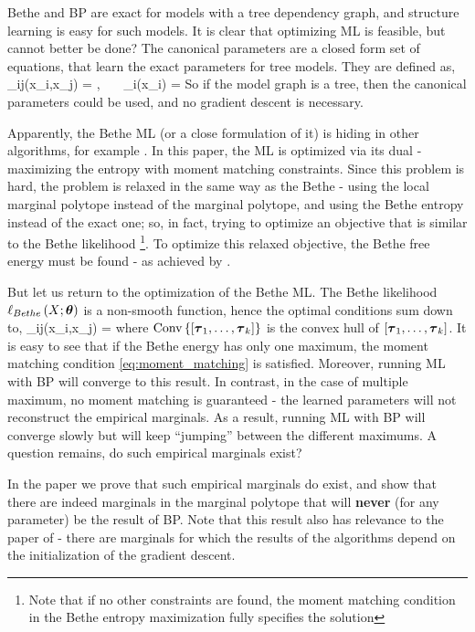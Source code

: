 Bethe and BP are exact for models with a tree dependency graph, and structure learning is easy for such models.
It is clear that optimizing ML is feasible, but cannot better be done?  
The canonical parameters are a closed form set of equations, that learn the exact parameters for tree models.
They are defined as,
\be
\label{eq:canonical}
\theta_{ij}(x_i,x_j) = , \ \ \ \theta_i(x_i) = 
\ee
So if the model graph is a tree, then the canonical parameters could be used, and no gradient descent is necessary.

Apparently, the Bethe ML (or a close formulation of it) is hiding in other algorithms, for example \cite{ganapathi2012constrained}.
In this paper, the ML is optimized via its dual - maximizing the entropy with moment matching constraints.
Since this problem is hard, the problem is relaxed in the same way as the Bethe - using the local marginal polytope instead of the marginal polytope, and using the Bethe entropy instead of the exact one; 
so, in fact, trying to optimize an objective that is similar to the Bethe likelihood \footnote{Note that if no other constraints are found, the moment matching condition in the Bethe entropy maximization fully specifies the solution}.
To optimize this relaxed objective, the Bethe free energy must be found - as achieved by \cite{yuille2002cccp}.

But let us return to the optimization of the Bethe ML.
The Bethe likelihood $\ell_{Bethe}\left(X;\boldsymbol{\theta}\right)$ is a non-smooth function, hence the optimal conditions sum down to,
\be
\label{eq:bethe_opt}
\mu_{ij}(x_i,x_j) = 
\ee
where $\text{Conv}\left\{[\boldsymbol{\tau}_1,\ldots,\boldsymbol{\tau}_k]\right\}$ is the convex hull of $[\boldsymbol{\tau}_1,\ldots,\boldsymbol{\tau}_k]$.
It is easy to see that if the Bethe energy has only one maximum, the moment matching condition \eqref{eq:moment_matching} is satisfied.
Moreover, running ML with BP will converge to this result.
In contrast, in the case of multiple maximum, no moment matching is guaranteed - the learned parameters will not reconstruct the empirical marginals.
As a result, running ML with BP will converge slowly but will keep ``jumping'' between the different maximums. 
A question remains, do such empirical marginals exist?

In the paper \cite{heinemann2012cannot} we prove that such empirical marginals do exist, and show that there are indeed marginals in the marginal polytope that will \textbf{never} (for any parameter) be the result of BP.
Note that this result also has relevance to the paper of \cite{ganapathi2012constrained} - there are marginals for which the results of the algorithms depend on the initialization of the gradient descent.   

